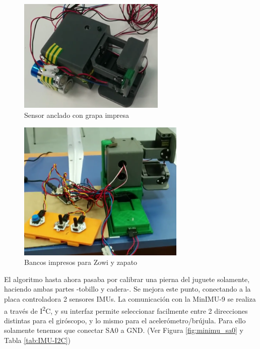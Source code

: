 \begin{figure}
\centering
\includegraphics[width=70mm]{Figures/grapa}
\caption[Sensor anclado con grapa impresa]{Sensor anclado con grapa impresa}
\label{fig:grapa}
\end{figure}


\begin{figure}
\centering
\includegraphics[width=80mm]{Figures/banco_1zapato}
\caption[Bancos impresos para Zowi y zapato]{Bancos impresos para Zowi y zapato}
\label{fig:banco_1zapato}
\end{figure}

El algoritmo hasta ahora pasaba por calibrar una pierna del juguete solamente, haciendo ambas partes -tobillo y cadera-. Se mejora este punto, conectando a la placa controladora 2 sensores IMUs. La comunicación con la MinIMU-9 se realiza a través de I\textsuperscript{2}C, y su interfaz permite seleccionar facilmente entre 2 direcciones distintas para el giróscopo, y lo mismo para el acelerómetro/brújula. Para ello solamente tenemos que conectar SA0 a GND. (Ver Figura \ref{fig:minimu_sa0} y Tabla \ref{tab:IMU-I2C})


